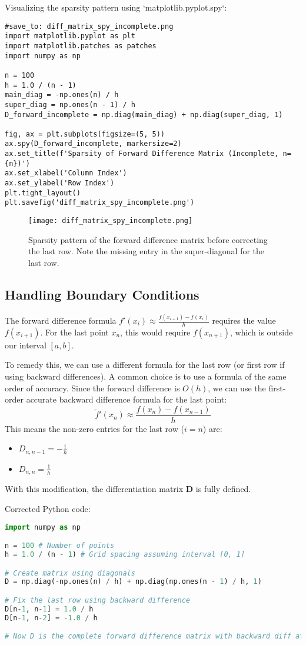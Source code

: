 \documentclass{article}
\begin{document}
Visualizing the sparsity pattern using `matplotlib.pyplot.spy`:
\begin{verbatim}
#save_to: diff_matrix_spy_incomplete.png
import matplotlib.pyplot as plt
import matplotlib.patches as patches
import numpy as np

n = 100
h = 1.0 / (n - 1)
main_diag = -np.ones(n) / h
super_diag = np.ones(n - 1) / h
D_forward_incomplete = np.diag(main_diag) + np.diag(super_diag, 1)

fig, ax = plt.subplots(figsize=(5, 5))
ax.spy(D_forward_incomplete, markersize=2)
ax.set_title(f'Sparsity of Forward Difference Matrix (Incomplete, n={n})')
ax.set_xlabel('Column Index')
ax.set_ylabel('Row Index')
plt.tight_layout()
plt.savefig('diff_matrix_spy_incomplete.png')
\end{verbatim}

\begin{figure}[H]
\centering
\texttt{[image: diff\_matrix\_spy\_incomplete.png]}
\caption{Sparsity pattern of the forward difference matrix before correcting the last row. Note the missing entry in the super-diagonal for the last row.}
\label{fig:diff_matrix_spy_incomplete}
\end{figure}

\subsection{Handling Boundary Conditions}
The forward difference formula $f'(x_i) \approx \frac{f(x_{i+1}) - f(x_i)}{h}$ requires the value $f(x_{i+1})$. For the last point $x_n$, this would require $f(x_{n+1})$, which is outside our interval $[a, b]$.

To remedy this, we can use a different formula for the last row (or first row if using backward differences). A common choice is to use a formula of the same order of accuracy. Since the forward difference is $O(h)$, we can use the first-order accurate backward difference formula for the last point:
\[
\tilde{f}'(x_n) \approx \frac{f(x_n) - f(x_{n-1})}{h}
\]
This means the non-zero entries for the last row ($i=n$) are:
\begin{itemize}
    \item $D_{n, n-1} = -\frac{1}{h}$
    \item $D_{n, n} = \frac{1}{h}$
\end{itemize}
With this modification, the differentiation matrix $\mathbf{D}$ is fully defined.

Corrected Python code:
\begin{lstlisting}[language=Python, breaklines=true]
import numpy as np

n = 100 # Number of points
h = 1.0 / (n - 1) # Grid spacing assuming interval [0, 1]

# Create matrix using diagonals
D = np.diag(-np.ones(n) / h) + np.diag(np.ones(n - 1) / h, 1)

# Fix the last row using backward difference
D[n-1, n-1] = 1.0 / h
D[n-1, n-2] = -1.0 / h

# Now D is the complete forward difference matrix with backward diff at boundary
\end{lstlisting}
\end{document}
